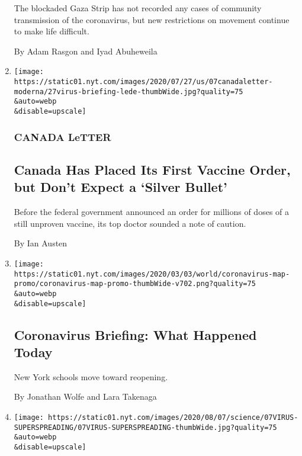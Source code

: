 \begin{enumerate}
  The blockaded Gaza Strip has not recorded any cases of community
  transmission of the coronavirus, but new restrictions on movement
  continue to make life difficult.

  By Adam Rasgon and Iyad Abuheweila
\item
  \href{/2020/08/07/world/canada/canada-letter-vaccine.html}{}

  \texttt{[image: https://static01.nyt.com/images/2020/07/27/us/07canadaletter-moderna/27virus-briefing-lede-thumbWide.jpg?quality=75\\\&auto=webp\\\&disable=upscale]}

  \hypertarget{canada-letter}{%
  \subsubsection{CANADA LeTTER}\label{canada-letter}}

  \hypertarget{canada-has-placed-its-first-vaccine-order-but-dont-expect-a-silver-bullet}{%
  \subsection{Canada Has Placed Its First Vaccine Order, but Don't
  Expect a `Silver
  Bullet'}\label{canada-has-placed-its-first-vaccine-order-but-dont-expect-a-silver-bullet}}

  Before the federal government announced an order for millions of doses
  of a still unproven vaccine, its top doctor sounded a note of caution.

  By Ian Austen
\item
  \href{/2020/08/07/us/coronavirus-today.html}{}

  \texttt{[image: https://static01.nyt.com/images/2020/03/03/world/coronavirus-map-promo/coronavirus-map-promo-thumbWide-v702.png?quality=75\\\&auto=webp\\\&disable=upscale]}

  \hypertarget{coronavirus-briefing-what-happened-today}{%
  \subsection{Coronavirus Briefing: What Happened
  Today}\label{coronavirus-briefing-what-happened-today}}

  New York schools move toward reopening.

  By Jonathan Wolfe and Lara Takenaga
\item
  \href{/2020/08/07/health/coronavirus-superspreading-contagion.html}{}

  \texttt{[image: https://static01.nyt.com/images/2020/08/07/science/07VIRUS-SUPERSPREADING/07VIRUS-SUPERSPREADING-thumbWide.jpg?quality=75\\\&auto=webp\\\&disable=upscale]}


\end{enumerate}
